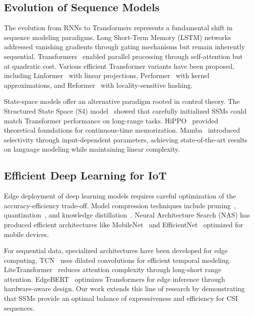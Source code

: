 \documentclass[journal]{IEEEtran}
\begin{document}
\subsection{Evolution of Sequence Models}

The evolution from RNNs to Transformers represents a fundamental shift in sequence modeling paradigms. Long Short-Term Memory (LSTM) networks~\cite{hochreiter1997lstm} addressed vanishing gradients through gating mechanisms but remain inherently sequential. Transformers~\cite{vaswani2017attention} enabled parallel processing through self-attention but at quadratic cost. Various efficient Transformer variants have been proposed, including Linformer~\cite{wang2020linformer} with linear projections, Performer~\cite{choromanski2020performer} with kernel approximations, and Reformer~\cite{kitaev2020reformer} with locality-sensitive hashing.

State-space models offer an alternative paradigm rooted in control theory. The Structured State Space (S4) model~\cite{gu2021efficiently} showed that carefully initialized SSMs could match Transformer performance on long-range tasks. HiPPO~\cite{gu2020hippo} provided theoretical foundations for continuous-time memorization. Mamba~\cite{gu2023mamba} introduced selectivity through input-dependent parameters, achieving state-of-the-art results on language modeling while maintaining linear complexity.

\subsection{Efficient Deep Learning for IoT}

Edge deployment of deep learning models requires careful optimization of the accuracy-efficiency trade-off. Model compression techniques include pruning~\cite{han2015pruning}, quantization~\cite{jacob2018quantization}, and knowledge distillation~\cite{hinton2015distilling}. Neural Architecture Search (NAS) has produced efficient architectures like MobileNet~\cite{howard2017mobilenets} and EfficientNet~\cite{tan2019efficientnet} optimized for mobile devices.

For sequential data, specialized architectures have been developed for edge computing. TCN~\cite{bai2018tcn} uses dilated convolutions for efficient temporal modeling. LiteTransformer~\cite{wu2020lite} reduces attention complexity through long-short range attention. EdgeBERT~\cite{tambe2021edgebert} optimizes Transformers for edge inference through hardware-aware design. Our work extends this line of research by demonstrating that SSMs provide an optimal balance of expressiveness and efficiency for CSI sequences.
\end{document}

